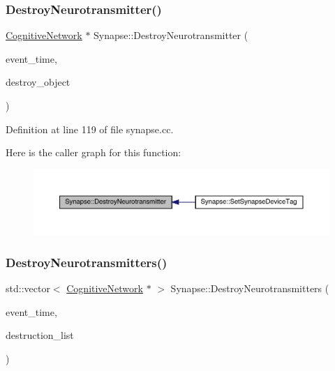 \subsubsection{\texorpdfstring{Destroy\+Neurotransmitter()}{DestroyNeurotransmitter()}}
{\footnotesize\ttfamily \hyperlink{class_cognitive_network}{Cognitive\+Network} $\ast$ Synapse\+::\+Destroy\+Neurotransmitter (\begin{DoxyParamCaption}\item[{std\+::chrono\+::time\+\_\+point$<$ \hyperlink{universe_8h_a0ef8d951d1ca5ab3cfaf7ab4c7a6fd80}{Clock} $>$}]{event\+\_\+time,  }\item[{\hyperlink{class_cognitive_network}{Cognitive\+Network} $\ast$}]{destroy\+\_\+object }\end{DoxyParamCaption})}



Definition at line 119 of file synapse.\+cc.

Here is the caller graph for this function\+:\nopagebreak
\begin{figure}[H]
\begin{center}
\leavevmode
\includegraphics[width=350pt]{class_synapse_a8d53488bdd8f0bd97216e5d388df35b8_icgraph}
\end{center}
\end{figure}
\mbox{\label{class_synapse_a58c882f356bc34c66a7cd2b345532ec9}} 
\subsubsection{\texorpdfstring{Destroy\+Neurotransmitters()}{DestroyNeurotransmitters()}}
{\footnotesize\ttfamily std\+::vector$<$ \hyperlink{class_cognitive_network}{Cognitive\+Network} $\ast$ $>$ Synapse\+::\+Destroy\+Neurotransmitters (\begin{DoxyParamCaption}\item[{std\+::chrono\+::time\+\_\+point$<$ \hyperlink{universe_8h_a0ef8d951d1ca5ab3cfaf7ab4c7a6fd80}{Clock} $>$}]{event\+\_\+time,  }\item[{std\+::vector$<$ \hyperlink{class_cognitive_network}{Cognitive\+Network} $\ast$$>$}]{destruction\+\_\+list }\end{DoxyParamCaption})}



